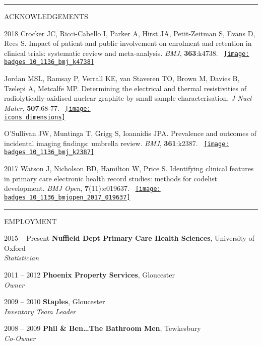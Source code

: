 \documentclass[10pt,a4paper]{article}
\def\badges{./badges/}
\def\icons{./icons/}
\begin{document}
\noindent\rule{\textwidth}{0.4pt}
\begin{cvlist}{ACKNOWLEDGEMENTS}
	
	\item[2018]
	Crocker JC, Ricci-Cabello I, Parker A, Hirst JA, Petit-Zeitman S, Evans D, Rees S. Impact of patient and public involvement on enrolment and retention in clinical trials: systematic review and meta-analysis. \textit{BMJ}, \textbf{363}:k4738. ~\href{https://bmj.altmetric.com/details/51859816}{\texttt{[image: \\badges 10\_1136\_bmj\_k4738]}}
	
	\item[]
	Jordan MSL, Ramsay P, Verrall KE, van Staveren TO, Brown M, Davies B, Tzelepi A, Metcalfe MP. Determining the electrical and thermal resistivities of radiolytically-oxidised nuclear graphite by small sample characterisation. \textit{J Nucl Mater}, \textbf{507}:68-77. ~\href{https://badge.dimensions.ai/details/id/pub.1103593195}{\texttt{[image: \\icons dimensions]}}
	
	\item[]
	O'Sullivan JW, Muntinga T, Grigg S, Ioannidis JPA. Prevalence and outcomes of incidental imaging findings: umbrella review. \textit{BMJ}, \textbf{361}:k2387. ~\href{https://bmj.altmetric.com/details/43831617}{\texttt{[image: \\badges 10\_1136\_bmj\_k2387]}}
	
	\item[2017]
	Watson J, Nicholson BD, Hamilton W, Price S. Identifying clinical features in primary care electronic health record studies: methods for codelist development. \textit{BMJ Open}, \textbf{7}(11):e019637. ~\href{https://bmj.altmetric.com/details/29319273}{\texttt{[image: \\badges 10\_1136\_bmjopen\_2017\_019637]}}
	
\end{cvlist}


\noindent\rule{\textwidth}{0.4pt}
\begin{cvlist}{EMPLOYMENT}
  
  \item[2015 -- Present]
  \textbf{Nuffield Dept Primary Care Health Sciences}, University of Oxford \\
  \textit{Statistician}
  
  \item[2011 -- 2012]
  \textbf{Phoenix Property Services}, Gloucester \\
  \textit{Owner}
  
  \item[2009 -- 2010]
  \textbf{Staples}, Gloucester \\
  \textit{Inventory Team Leader}
  
  \item[2008 -- 2009]
  \textbf{Phil \& Ben\ldots The Bathroom Men}, Tewkesbury \\
  \textit{Co-Owner}
  
\end{cvlist}
\end{document}
